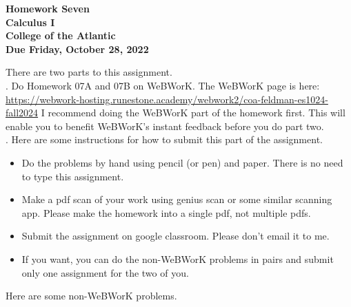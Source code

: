 \documentclass[12pt]{article}
\begin{document}
\pagestyle{empty}
 
\begin{center}
{\LARGE {\bf Homework Seven}}\\
\bigskip
{\Large {\bf Calculus I}}\\
\bigskip
{\Large {\bf College of the Atlantic}}\\
\bigskip
{ {\bf Due Friday, October 28, 2022}}\\ 
\end{center}
\medskip

\noindent There are two parts to this assignment.\\

.  Do Homework 07A and 07B on
WeBWorK.  The WeBWorK page is here:
\url{https://webwork-hosting.runestone.academy/webwork2/coa-feldman-es1024-fall2024}
I recommend doing the WeBWorK part of the homework first. This will
enable you to benefit WeBWorK's instant feedback before you do part
two.\\ 


.  Here are some
instructions for how to submit this part of the assignment.
\begin{itemize}
  \setlength{\itemsep}{0mm}
\item Do the problems by hand using pencil (or pen) and paper.
  There is no need to type this assignment.
\item Make a pdf scan of your work using genius scan or some
  similar scanning app.  Please make the homework into a single
  pdf, not multiple pdfs.
\item Submit the assignment on google classroom.  Please don't
  email it to me.
\item If you want, you can do the non-WeBWorK problems in pairs and
  submit only one assignment for the two of you. \\
\end{itemize}

\noindent Here are some non-WeBWorK problems.\\
\end{document}
